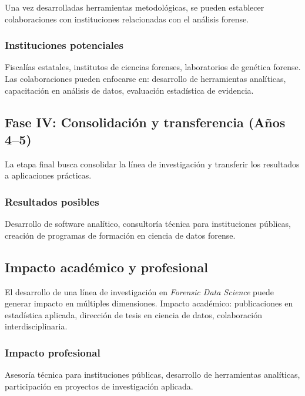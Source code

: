 \documentclass[a4paper,10pt,oneside]{article}
\begin{document}
Una vez desarrolladas herramientas metodol\'ogicas, se pueden establecer colaboraciones con instituciones relacionadas con el an\'alisis forense.

\subsubsection*{Instituciones potenciales}

Fiscal\'ias estatales, institutos de ciencias forenses, laboratorios de gen\'etica forense. Las colaboraciones pueden enfocarse en: desarrollo de herramientas anal\'iticas, capacitaci\'on en an\'alisis de datos, evaluaci\'on estad\'istica de evidencia.

\subsection{Fase IV: Consolidaci\'on y transferencia (A\~nos 4--5)}

La etapa final busca consolidar la l\'inea de investigaci\'on y transferir los resultados a aplicaciones pr\'acticas.

\subsubsection*{Resultados posibles}

Desarrollo de software anal\'itico, consultor\'ia t\'ecnica para instituciones p\'ublicas, creaci\'on de programas de formaci\'on en ciencia de datos forense.

\subsection{Impacto acad\'emico y profesional}

El desarrollo de una l\'inea de investigaci\'on en \textit{Forensic Data Science} puede generar impacto en m\'ultiples dimensiones. Impacto acad\'emico: publicaciones en estad\'istica aplicada, direcci\'on de tesis en ciencia de datos, colaboraci\'on interdisciplinaria.

\subsubsection*{Impacto profesional}

Asesor\'ia t\'ecnica para instituciones p\'ublicas, desarrollo de herramientas anal\'iticas, participaci\'on en proyectos de investigaci\'on aplicada.

\end{document}
